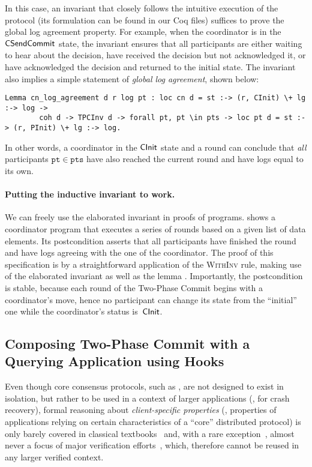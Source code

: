 In this case, an invariant that closely follows the intuitive
execution of the protocol (its formulation can be found in our Coq
files) suffices to prove the global log agreement property.
%
For example, when the coordinator is in the $\mathsf{CSendCommit}$ state, the
invariant ensures that all participants are either waiting to hear
about the decision, have received the decision but not acknowledged
it, or have acknowledged the decision and returned to the initial state.
%
The invariant also implies a simple statement of \emph{global log agreement},
shown below:
%
\begin{lstlisting}[style=Coq, basicstyle=\footnotesize\ttfamily]
Lemma cn_log_agreement d r log pt : loc cn d = st :-> (r, CInit) \+ lg :-> log ->
        coh d -> TPCInv d -> forall pt, pt \in pts -> loc pt d = st :-> (r, PInit) \+ lg :-> log.
\end{lstlisting}
%
In other words, a coordinator  in the $\mathsf{CInit}$ state and a
round  can conclude that \emph{all} participants
{\small{$\mathtt{pt} \in \mathtt{pts}$}} have also reached the current
round  and have logs equal to its own.

\paragraph{Putting the inductive invariant to work.~}

We can freely use the elaborated invariant in proofs of programs.
%
 shows a coordinator program that executes
a series of rounds based on a given list  of data
elements.
%
Its postcondition asserts that all participants have finished the
round and have logs agreeing with the one of the coordinator.
%
The proof of this specification is by a straightforward application of
the \textsc{WithInv} rule, making use of the elaborated invariant
 as well as the lemma .
%
Importantly, the postcondition is stable, because each round of the
Two-Phase Commit begins with a coordinator's move, hence no
participant can change its state from the ``initial'' one while the
coordinator's status is~$\mathsf{CInit}$.

\subsection{Composing Two-Phase Commit with a Querying Application
  using Hooks}
\label{sec:composing-two-phase}


Even though core consensus protocols, such as , are not
designed to exist in isolation, but rather to be used in a context of
larger applications (\eg, for crash recovery), formal reasoning about
\emph{client-specific properties} (\ie, properties of applications
relying on certain characteristics of a ``core'' distributed protocol) is only
barely covered in classical textbooks~\cite{Weikum-Vossen:TIS02} and,
with a rare exception~\cite{Lesani-al:POPL16}, almost never a focus of
major verification
efforts~\cite{Woos-al:CPP16,Hawblitzel-al:SOSP15,rahli:eventml-avocs},
which, therefore cannot be reused in any larger verified context.

